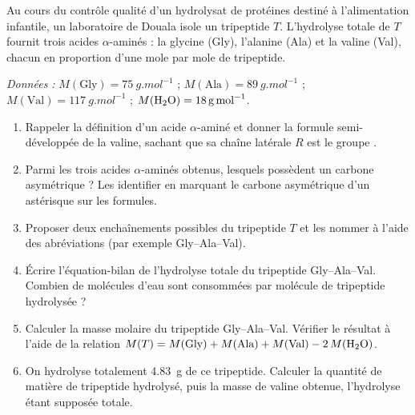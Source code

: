 \documentclass[11pt]{article}
\begin{document}
\begin{exercice}
Au cours du contrôle qualité d'un hydrolysat de protéines destiné à l'alimentation infantile, un laboratoire de Douala isole un tripeptide $T$. L'hydrolyse totale de $T$ fournit trois acides $\alpha$-aminés : la glycine (Gly), l'alanine (Ala) et la valine (Val), chacun en proportion d'une mole par mole de tripeptide.

\emph{Données :} $M(\text{Gly}) = \SI{75}{g.mol^{-1}}$ ; $M(\text{Ala}) = \SI{89}{g.mol^{-1}}$ ; $M(\text{Val}) = \SI{117}{g.mol^{-1}}$ ; $M(\ce{H2O}) = \SI{18}{g.mol^{-1}}$.
\begin{enumerate}
\item Rappeler la définition d'un acide $\alpha$-aminé et donner la formule semi-développée de la valine, sachant que sa chaîne latérale $R$ est le groupe .
\item Parmi les trois acides $\alpha$-aminés obtenus, lesquels possèdent un carbone asymétrique ? Les identifier en marquant le carbone asymétrique d'un astérisque sur les formules.
\item Proposer deux enchaînements possibles du tripeptide $T$ et les nommer à l'aide des abréviations (par exemple Gly--Ala--Val).
\item Écrire l'équation-bilan de l'hydrolyse totale du tripeptide Gly--Ala--Val. Combien de molécules d'eau sont consommées par molécule de tripeptide hydrolysée ?
\item Calculer la masse molaire du tripeptide Gly--Ala--Val. Vérifier le résultat à l'aide de la relation $M(T) = M(\text{Gly}) + M(\text{Ala}) + M(\text{Val}) - 2\,M(\ce{H2O})$.
\item On hydrolyse totalement \SI{4,83}{g} de ce tripeptide. Calculer la quantité de matière de tripeptide hydrolysé, puis la masse de valine obtenue, l'hydrolyse étant supposée totale.
\end{enumerate}
\end{exercice}
\end{document}
